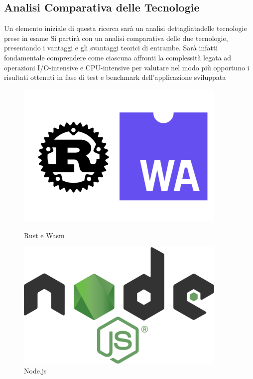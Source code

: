 \subsection{Analisi Comparativa delle Tecnologie}
Un elemento iniziale di questa ricerca sarà un analisi dettagliatadelle tecnologie prese in esame 
Si partirà con un analisi comparativa delle due tecnologie, presentando i vantaggi e gli svantaggi teorici di entrambe. Sarà infatti fondamentale comprendere come ciascuna affronti la complessità legata ad operazioni I/O-intensive e CPU-intensive per valutare nel modo più opportuno i risultati ottenuti in fase di test e benchmark dell'applicazione sviluppata
\begin{figure}
        \centering
        \begin{minipage}{0.40\textwidth}
            \centering
            \includegraphics[width=0.9\textwidth]{images/rustwasm.jpg} %
            \caption{Rust e Wasm}
        \end{minipage}\hfill
        \begin{minipage}{0.40\textwidth}
            \centering
            \includegraphics[width=0.9\textwidth]{images/node.png} %
            \caption{Node.js}
        \end{minipage}
    \end{figure}
